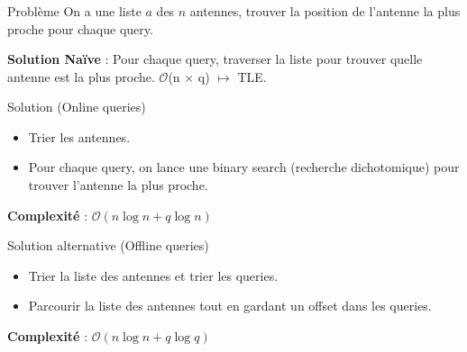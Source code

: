 \begin{frame}
    \frametitle{\problemtitle}
    \begin{block}{Problème}
        On a une liste $a$ des $n$ antennes, trouver la position de l'antenne la plus proche pour chaque query.
    \end{block}
    \pause
    \textbf{Solution Naïve} : Pour chaque query, traverser la liste pour trouver quelle antenne est la plus proche.
    \pause
    $\mathcal{O}$(n $\times$ q) $\mapsto$ TLE.\\
    \pause
    \begin{block}{Solution (Online queries)}
        \begin{itemize}
            \item<+-> Trier les antennes.
            \item<+-> Pour chaque query, on lance une binary search (recherche dichotomique) pour trouver l'antenne la plus proche.
        \end{itemize}
        \pause
        \textbf{Complexité} : $\mathcal{O}(n \log n + q\log n)$
    \end{block}
    \pause
    \begin{block}{Solution alternative (Offline queries)}
        \begin{itemize}
            \item Trier la liste des antennes et trier les queries.
            \item Parcourir la liste des antennes tout en gardant un offset dans les queries.
        \end{itemize}
        \pause
        \textbf{Complexité} : $\mathcal{O}(n \log n + q\log q)$
    \end{block}

\end{frame}
